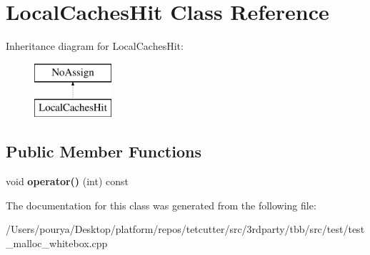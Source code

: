 \hypertarget{classLocalCachesHit}{}\section{Local\+Caches\+Hit Class Reference}
\label{classLocalCachesHit}
Inheritance diagram for Local\+Caches\+Hit\+:\begin{figure}[H]
\begin{center}
\leavevmode
\includegraphics[height=2.000000cm]{classLocalCachesHit}
\end{center}
\end{figure}
\subsection*{Public Member Functions}
\begin{DoxyCompactItemize}
\item 
\hypertarget{classLocalCachesHit_a5b85a1a50a8abdd7e7ae37cc416870cc}{}void {\bfseries operator()} (int) const \label{classLocalCachesHit_a5b85a1a50a8abdd7e7ae37cc416870cc}

\end{DoxyCompactItemize}


The documentation for this class was generated from the following file\+:\begin{DoxyCompactItemize}
\item 
/\+Users/pourya/\+Desktop/platform/repos/tetcutter/src/3rdparty/tbb/src/test/test\+\_\+malloc\+\_\+whitebox.\+cpp\end{DoxyCompactItemize}
